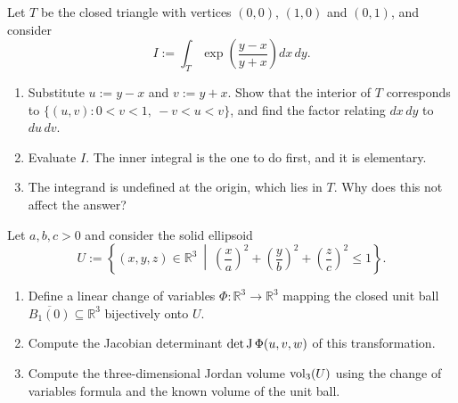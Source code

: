
\begin{aiexercise}
\label{ex:ai_triangle_substitution}
Let $T$ be the closed triangle with vertices $(0,0)$, $(1,0)$ and $(0,1)$, and consider
\[I := \int_T \exp\!\left(\frac{y-x}{y+x}\right)dx\,dy.\]
\begin{enumerate}[label=\textbf{(\alph*)}]
  \item Substitute $u := y-x$ and $v := y+x$. Show that the interior of $T$ corresponds to
    $\{(u,v) : 0 < v < 1,\ -v < u < v\}$, and find the factor relating $dx\,dy$ to $du\,dv$.
  \item Evaluate $I$. The inner integral is the one to do first, and it is elementary.
  \item The integrand is undefined at the origin, which lies in $T$. Why does this not affect
    the answer?
\end{enumerate}
\end{aiexercise}

\begin{exercise}
\label{ex:volume_ellipsoid_change_variables}
Let $a, b, c > 0$ and consider the solid ellipsoid
\[U := \left\{(x,y,z) \in \mathbb{R}^3 \ \middle|\ \left(\frac{x}{a}\right)^2 + \left(\frac{y}{b}\right)^2 + \left(\frac{z}{c}\right)^2 \leq 1\right\}.\]
\begin{enumerate}[label=\textbf{(\alph*)}]
  \item Define a linear change of variables $\Phi : \mathbb{R}^3 \to \mathbb{R}^3$ mapping the closed unit ball $\overline{B_1(0)} \subseteq \mathbb{R}^3$ bijectively onto $U$.
  \item Compute the Jacobian determinant $\det \operatorname{J}\Phi(u,v,w)$ of this transformation.
  \item Compute the three-dimensional Jordan volume $\operatorname{vol}_3(U)$ using the change of variables formula and the known volume of the unit ball.
\end{enumerate}
\end{exercise}


